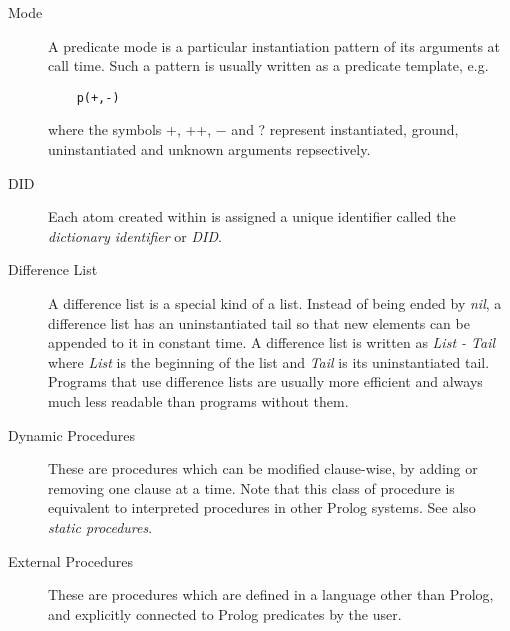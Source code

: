 \begin{description}
\item[Mode]
A predicate mode is a particular instantiation pattern of its arguments
at call time.  Such a pattern is usually written as a predicate template, e.g.
\begin{verbatim}
    p(+,-)
\end{verbatim}
where the symbols +, ++, $-$ and ? represent instantiated, ground,
uninstantiated and unknown arguments repsectively.

\item[DID]
Each atom created within {\eclipse} is assigned a unique
identifier called the {\it dictionary identifier} or {\it DID}.

\item[Difference List]
A difference list is a special kind of a list.
Instead of being ended by {\it nil}, a difference list
has an uninstantiated tail so that new elements
can be appended to it in constant time.
A difference list is written as {\it List - Tail}
where {\it List} is the beginning of the list and {\it Tail}
is its uninstantiated tail.
Programs that use difference lists are usually more efficient
and always much less readable than programs without them.

\item[Dynamic Procedures]
These are procedures which can be modified clause-wise, by adding or removing 
one clause at a time. Note that this class of procedure is equivalent to 
interpreted procedures in other Prolog systems. See also {\it static 
procedures}.


\item[External Procedures]
These are procedures which are defined in a language
other than Prolog, and explicitly connected to Prolog predicates by the user.


\end{description}

